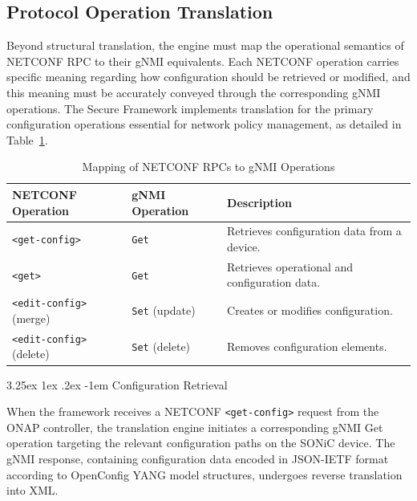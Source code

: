 \documentclass[12pt, a4paper, reqno, oneside]{book}
\makeatletter
\renewcommand\paragraph{\@startsection{paragraph}{5}{\z@}%
  {3.25ex \@plus1ex \@minus.2ex}%
  {-1em}%
  {\normalfont\normalsize\bfseries}}
\makeatother
\begin{document}
\subsection{Protocol Operation Translation}

\label{sec:protocol_translation}

Beyond structural translation, the engine must map the operational semantics of NETCONF RPC to their gNMI equivalents. Each NETCONF operation carries specific meaning regarding how configuration should be retrieved or modified, and this meaning must be accurately conveyed through the corresponding gNMI operations. The Secure Framework implements translation for the primary configuration operations essential for network policy management, as detailed in Table~\ref{tab:protocol_mapping}.

\begin{table}[H]
    \centering
    \caption{Mapping of NETCONF RPCs to gNMI Operations}
    \label{tab:protocol_mapping}
    \begin{tabular}{|l|l|l|}
        \hline
        \textbf{NETCONF Operation} & \textbf{gNMI Operation} & \textbf{Description} \\
        \hline
        \texttt{<get-config>} & \texttt{Get} & Retrieves configuration data from a device. \\
        \texttt{<get>} & \texttt{Get} & Retrieves operational and configuration data. \\
        \texttt{<edit-config>} (merge) & \texttt{Set} (update) & Creates or modifies configuration. \\
        \texttt{<edit-config>} (delete) & \texttt{Set} (delete) & Removes configuration elements. \\
        \hline
    \end{tabular}
\end{table}

\paragraph{Configuration Retrieval}

When the framework receives a NETCONF \texttt{<get-config>} request from the ONAP controller, the translation engine initiates a corresponding gNMI Get operation targeting the relevant configuration paths on the SONiC device. The gNMI response, containing configuration data encoded in JSON-IETF format according to OpenConfig YANG model structures, undergoes reverse translation into XML.
\end{document}
